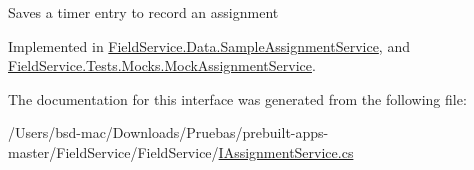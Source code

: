 Saves a timer entry to record an assignment 



Implemented in \hyperlink{class_field_service_1_1_data_1_1_sample_assignment_service_acfaa9c42802ecc8bd65e1c4b5c7b3fdf}{Field\+Service.\+Data.\+Sample\+Assignment\+Service}, and \hyperlink{class_field_service_1_1_tests_1_1_mocks_1_1_mock_assignment_service_a63732bc78fb6e33479130295a5f3618d}{Field\+Service.\+Tests.\+Mocks.\+Mock\+Assignment\+Service}.



The documentation for this interface was generated from the following file\+:\begin{DoxyCompactItemize}
\item 
/\+Users/bsd-\/mac/\+Downloads/\+Pruebas/prebuilt-\/apps-\/master/\+Field\+Service/\+Field\+Service/\hyperlink{_i_assignment_service_8cs}{I\+Assignment\+Service.\+cs}\end{DoxyCompactItemize}
